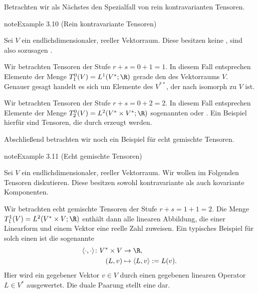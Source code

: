\documentclass[letterpaper,10pt,german]{jupyterBook}
\begin{document}
\sphinxAtStartPar
Betrachten wir als Nächstes den Spezialfall von rein kontravarianten Tensoren.
\label{vektoranalysis/tensor:example-23}
\begin{sphinxadmonition}{note}{Example 3.10 (Rein kontravariante Tensoren)}



\sphinxAtStartPar
Sei \(V\) ein endlich\sphinxhyphen{}dimensionaler, reeller Vektorraum.
Diese besitzen keine , sind also sozusagen .

\sphinxAtStartPar
{}
Wir betrachten Tensoren der Stufe \(r+s=0+1=1\).
In diesem Fall entsprechen Elemente der Menge \(T^0_1(V) = L^1(V^\ast; \R)\) gerade den  des Vektorraums \(V\).
Genauer gesagt handelt es sich um Elemente des  \(V^{**}\), der nach {\hyperref[\detokenize{vektoranalysis/multilinear:rem:doubledual}]{}} isomorph zu \(V\) ist.

\sphinxAtStartPar
{}
Wir betrachten Tensoren der Stufe \(r+s=0+2=2\).
In diesem Fall entsprechen Elemente der Menge \(T^0_2(V) = L^2(V^\ast \times V^\ast; \R)\) sogenannten  oder .
Ein Beispiel hierfür sind Tensoren, die durch  erzeugt werden.
\end{sphinxadmonition}

\sphinxAtStartPar
Abschließend betrachten wir noch ein Beispiel für echt gemischte Tensoren.
\label{vektoranalysis/tensor:example-24}
\begin{sphinxadmonition}{note}{Example 3.11 (Echt gemischte Tensoren)}



\sphinxAtStartPar
Sei \(V\) ein endlich\sphinxhyphen{}dimensionaler, reeller Vektorraum.
Wir wollen im Folgenden  Tensoren diskutieren.
Diese besitzen sowohl kontravariante als auch kovariante Komponenten.

\sphinxAtStartPar
Wir betrachten echt gemischte Tensoren der Stufe \(r+s=1+1=2\).
Die Menge \(T^1_1(V) = L^2(V^\ast \times V; \R)\) enthält dann alle linearen Abbildung, die einer Linearform und einem Vektor eine reelle Zahl zuweisen.
Ein typisches Beispiel für solch einen ist die sogenannte 
\begin{equation*}
\begin{split}\langle \cdot, \cdot \rangle \colon V^\ast \times V &\rightarrow \R,\\
(L, v) &\mapsto \langle L, v \rangle := L(v).\end{split}
\end{equation*}
\sphinxAtStartPar
Hier wird ein gegebener Vektor \(v \in V\) durch einen gegebenen linearen Operator \(L \in V^\ast\) ausgewertet.
Die duale Paarung stellt eine  dar.
\end{sphinxadmonition}
\end{document}
